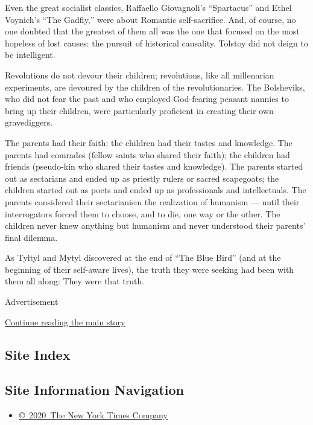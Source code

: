 Even the great socialist classics, Raffaello Giovagnoli's ``Spartacus''
and Ethel Voynich's ``The Gadfly,'' were about Romantic self-sacrifice.
And, of course, no one doubted that the greatest of them all was the one
that focused on the most hopeless of lost causes: the pursuit of
historical causality. Tolstoy did not deign to be intelligent.

Revolutions do not devour their children; revolutions, like all
millenarian experiments, are devoured by the children of the
revolutionaries. The Bolsheviks, who did not fear the past and who
employed God-fearing peasant nannies to bring up their children, were
particularly proficient in creating their own gravediggers.

The parents had their faith; the children had their tastes and
knowledge. The parents had comrades (fellow saints who shared their
faith); the children had friends (pseudo-kin who shared their tastes and
knowledge). The parents started out as sectarians and ended up as
priestly rulers or sacred scapegoats; the children started out as poets
and ended up as professionals and intellectuals. The parents considered
their sectarianism the realization of humanism --- until their
interrogators forced them to choose, and to die, one way or the other.
The children never knew anything but humanism and never understood their
parents' final dilemma.

As Tyltyl and Mytyl discovered at the end of ``The Blue Bird'' (and at
the beginning of their self-aware lives), the truth they were seeking
had been with them all along: They were that truth.

Advertisement

\protect\hyperlink{after-bottom}{Continue reading the main story}

\hypertarget{site-index}{%
\subsection{Site Index}\label{site-index}}

\hypertarget{site-information-navigation}{%
\subsection{Site Information
Navigation}\label{site-information-navigation}}

\begin{itemize}
\tightlist
\item
  \href{https://help.nytimes3xbfgragh.onion/hc/en-us/articles/115014792127-Copyright-notice}{©~2020~The
  New York Times Company}
\end{itemize}

